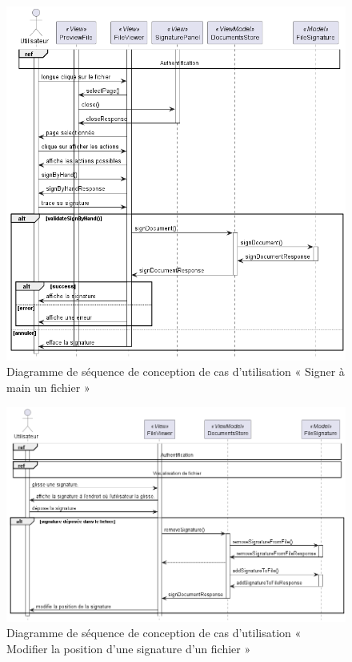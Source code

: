 \begin{figure}[H]
  \centering
  \includegraphics[width=1\textwidth]{out/diagrams/sprint4/sequence_sign_by_hand/sequence_sign_by_hand}
  \caption{Diagramme de séquence de conception de cas d'utilisation « Signer à main un fichier »}
  \label{fig:sequence_conception_sign_by_hand}
\end{figure}

\begin{figure}[H]
  \centering
  \includegraphics[width=1\textwidth]{out/diagrams/sprint4/sequence_move_signature/sequence_move_signature}
  \caption{Diagramme de séquence de conception de cas d'utilisation « Modifier la position d’une signature d’un fichier »}
  \label{fig:sequence_conception_move_signature}
\end{figure}

